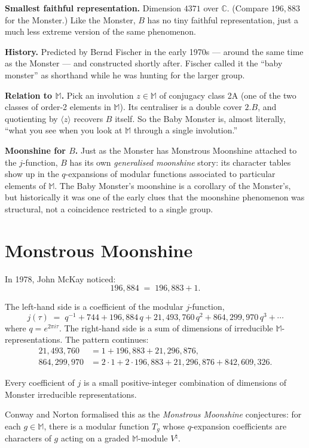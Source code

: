 \documentclass[11pt]{article}
\newcommand{\M}{\mathbb{M}}
\newcommand{\C}{\mathbb{C}}
\begin{document}
\textbf{Smallest faithful representation.} Dimension $4371$ over $\C$.
(Compare $196{,}883$ for the Monster.) Like the Monster, $B$ has no
tiny faithful representation, just a much less extreme version of the
same phenomenon.

\textbf{History.} Predicted by Bernd Fischer in the early 1970s ---
around the same time as the Monster --- and constructed shortly after.
Fischer called it the ``baby monster'' as shorthand while he was
hunting for the larger group.

\textbf{Relation to $\M$.} Pick an involution $z \in \M$ of conjugacy
class 2A (one of the two classes of order-2 elements in $\M$). Its
centraliser is a double cover $2.B$, and quotienting by $\langle
z\rangle$ recovers $B$ itself. So the Baby Monster is, almost
literally, ``what you see when you look at $\M$ through a single
involution.''

\textbf{Moonshine for $B$.} Just as the Monster has Monstrous
Moonshine attached to the $j$-function, $B$ has its own
\emph{generalised moonshine} story: its character tables show up in
the $q$-expansions of modular functions associated to particular
elements of $\M$. The Baby Monster's moonshine is a corollary of
the Monster's, but historically it was one of the early clues that
the moonshine phenomenon was structural, not a coincidence
restricted to a single group.

\section*{Monstrous Moonshine}

In 1978, John McKay noticed:
\[
196{,}884 \;=\; 196{,}883 + 1.
\]

\noindent The left-hand side is a coefficient of the modular $j$-function,
\[
j(\tau) \;=\; q^{-1} + 744 + 196{,}884\,q + 21{,}493{,}760\,q^2 + 864{,}299{,}970\,q^3 + \cdots
\]
where $q = e^{2\pi i \tau}$. The right-hand side is a sum of dimensions
of irreducible $\M$-representations. The pattern continues:
\begin{align*}
21{,}493{,}760  &= 1 + 196{,}883 + 21{,}296{,}876 ,\\
864{,}299{,}970 &= 2\cdot 1 + 2\cdot 196{,}883 + 21{,}296{,}876 + 842{,}609{,}326 .
\end{align*}

\noindent Every coefficient of $j$ is a small positive-integer combination
of dimensions of Monster irreducible representations.

Conway and Norton formalised this as the \emph{Monstrous Moonshine}
conjectures: for each $g \in \M$, there is a modular function $T_g$
whose $q$-expansion coefficients are characters of $g$ acting on a
graded $\M$-module $V^{\natural}$.
\end{document}
